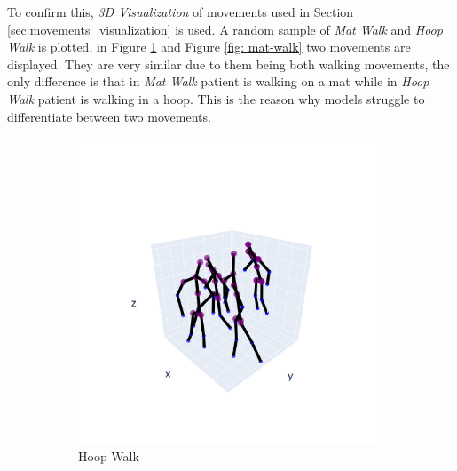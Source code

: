             \newpage

            To confirm this, \textit{3D Visualization} of movements used in Section \ref{sec:movements_visualization} is used. A random sample of \textit{Mat Walk} and \textit{Hoop Walk} is plotted, in Figure \ref{fig: hoop-walk} and Figure \ref{fig: mat-walk} two movements are displayed. They are very similar due to them being both walking movements, the only difference is that in \textit{Mat Walk} patient is walking on a mat while in \textit{Hoop Walk} patient is walking in a hoop. This is the reason why models struggle to differentiate between two movements.

            \begin{figure}[h]
                \begin{subfigure}{.5\textwidth}
                \centering
                  \includegraphics[width=1.\linewidth]{../src/resources/plots/movements/mov-1.png}
                  \caption{Hoop Walk}
                  \label{fig: hoop-walk}
                \end{subfigure}
                \begin{subfigure}{.5\textwidth}
                \centering

\end{subfigure}
\end{figure}
